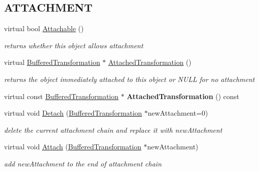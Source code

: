 \subsection*{ATTACHMENT}
\label{_amgrp357bd74edad7a5ca38986b70368e07b5}
 \begin{DoxyCompactItemize}
\item 
virtual bool \hyperlink{class_buffered_transformation_a20112606fc006c56f1561653cabd9542}{Attachable} ()
\begin{DoxyCompactList}\small\item\em returns whether this object allows attachment \item\end{DoxyCompactList}\item 
\hypertarget{class_buffered_transformation_aba6bbc169e26ed77a6bb5d50f91abda0}{
virtual \hyperlink{class_buffered_transformation}{BufferedTransformation} $\ast$ \hyperlink{class_buffered_transformation_aba6bbc169e26ed77a6bb5d50f91abda0}{AttachedTransformation} ()}
\label{class_buffered_transformation_aba6bbc169e26ed77a6bb5d50f91abda0}

\begin{DoxyCompactList}\small\item\em returns the object immediately attached to this object or NULL for no attachment \item\end{DoxyCompactList}\item 
\hypertarget{class_buffered_transformation_aa335cadbf21ff23876ad9aa67ef215f1}{
virtual const \hyperlink{class_buffered_transformation}{BufferedTransformation} $\ast$ {\bfseries AttachedTransformation} () const }
\label{class_buffered_transformation_aa335cadbf21ff23876ad9aa67ef215f1}

\item 
\hypertarget{class_buffered_transformation_a424737ad6b93e393dc43c3edb1223c3d}{
virtual void \hyperlink{class_buffered_transformation_a424737ad6b93e393dc43c3edb1223c3d}{Detach} (\hyperlink{class_buffered_transformation}{BufferedTransformation} $\ast$newAttachment=0)}
\label{class_buffered_transformation_a424737ad6b93e393dc43c3edb1223c3d}

\begin{DoxyCompactList}\small\item\em delete the current attachment chain and replace it with newAttachment \item\end{DoxyCompactList}\item 
\hypertarget{class_buffered_transformation_a583f6716aae8e4b6c83f43415a48befe}{
virtual void \hyperlink{class_buffered_transformation_a583f6716aae8e4b6c83f43415a48befe}{Attach} (\hyperlink{class_buffered_transformation}{BufferedTransformation} $\ast$newAttachment)}
\label{class_buffered_transformation_a583f6716aae8e4b6c83f43415a48befe}

\begin{DoxyCompactList}\small\item\em add newAttachment to the end of attachment chain \item\end{DoxyCompactList}\end{DoxyCompactItemize}


